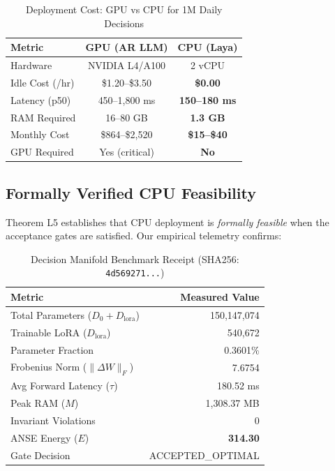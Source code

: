 \documentclass[10pt,journal,compsoc]{IEEEtran}
\theoremstyle{remark}
\begin{document}
\begin{table}[htbp]
\caption{Deployment Cost: GPU vs CPU for 1M Daily Decisions}
\label{tab:cost_comparison}
\centering
\begin{tabular}{lcc}
\toprule
\textbf{Metric} & \textbf{GPU (AR LLM)} & \textbf{CPU (Laya)} \\
\midrule
Hardware & NVIDIA L4/A100 & 2 vCPU \\
Idle Cost (/hr) & \$1.20--\$3.50 & \textbf{\$0.00} \\
Latency (p50) & 450--1,800 ms & \textbf{150--180 ms} \\
RAM Required & 16--80 GB & \textbf{1.3 GB} \\
Monthly Cost & \$864--\$2,520 & \textbf{\$15--\$40} \\
GPU Required & Yes (critical) & \textbf{No} \\
\bottomrule
\end{tabular}
\end{table}

\subsection{Formally Verified CPU Feasibility}

Theorem L5 establishes that CPU deployment is \emph{formally feasible} when the acceptance gates are satisfied. Our empirical telemetry confirms:

\begin{table}[htbp]
\caption{Decision Manifold Benchmark Receipt (SHA256: \texttt{4d569271...})}
\label{tab:manifold}
\centering
\begin{tabular}{lr}
\toprule
\textbf{Metric} & \textbf{Measured Value} \\
\midrule
Total Parameters ($D_0 + D_{\text{lora}}$) & 150,147,074 \\
Trainable LoRA ($D_{\text{lora}}$) & 540,672 \\
Parameter Fraction & 0.3601\% \\
Frobenius Norm ($\|\Delta W\|_F$) & 7.6754 \\
Avg Forward Latency ($\tau$) & 180.52 ms \\
Peak RAM ($M$) & 1,308.37 MB \\
Invariant Violations & 0 \\
ANSE Energy ($E$) & \textbf{314.30} \\
Gate Decision & ACCEPTED\_OPTIMAL \\
\bottomrule
\end{tabular}
\end{table}
\end{document}
